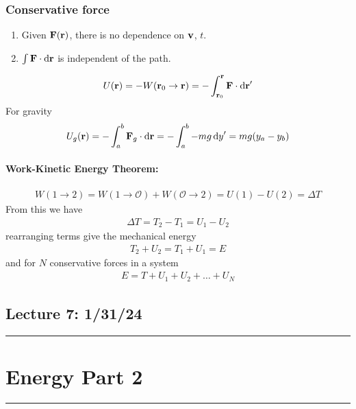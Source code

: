 \documentclass[../main.tex]{subfiles}
\begin{document}
\subsubsection*{Conservative force}
\begin{enumerate}
    \item Given $\vb{F}(\vb{r})$, there is no dependence on $\vb{v}$, $t$.
    \item $\int \vb{F} \cdot \dd{\vb{r}}$ is independent of the path.
\end{enumerate}
\begin{align*}
    U(\vb{r}) = -W (\vb{r}_0 \to \vb{r}) = -\int_{\vb{r}_0}^{\vb{r}} \vb{F} \cdot \dd{\vb{r}}'
\end{align*}
For gravity
\begin{align*}
    U_g (\vb{r}) = - \int_a^b \vb{F}_g \cdot \dd{\vb{r}} = - \int_a^b -mg \dd{y}' = mg(y_a - y_b)
\end{align*}
\paragraph{Work-Kinetic Energy Theorem:}
\begin{align*}
    W(1 \to 2) = W(1 \to \mathcal{O}) + W(\mathcal{O} \to 2) = U(1) - U(2) = \Delta T
\end{align*}
From this we have
\begin{align*}
    \Delta T = T_2 - T_1 = U_1 - U_2
\end{align*}
rearranging terms give the mechanical energy
\begin{align*}
    T_2 + U_2 = T_1 + U_1 = E
\end{align*}
and for $N$ conservative forces in a system
\begin{align*}
    E = T + U_1 + U_2 + \dots + U_N
\end{align*}

\pagebreak
\subsection*{Lecture 7: \hfill  1/31/24}
\hrule \vspace{10px}
\section*{Energy Part 2}
\hrule \vspace{10px}
\end{document}
